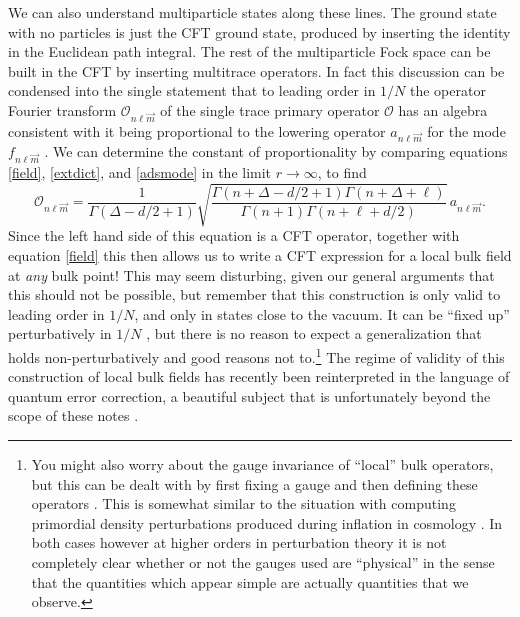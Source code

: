 \documentclass[12pt]{article}
\newcommand{\be}{\begin{equation}}
\newcommand{\ee}{\end{equation}}
\begin{document}
We can also understand multiparticle states along these lines.  The ground state with no particles is just the CFT ground state, produced by inserting the identity in the Euclidean path integral.  The rest of the multiparticle Fock space can be built in the CFT by inserting multitrace operators.  In fact this discussion can be condensed into the single statement that to leading order in $1/N$ the operator Fourier transform $\mathcal{O}_{n\ell\vec{m}}$ of the single trace primary operator $\mathcal{O}$ has an algebra consistent with it being proportional to the lowering operator $a_{n\ell\vec{m}}$ for the mode $f_{n\ell\vec{m}}$ \cite{Banks:1998dd}.  We can determine the constant of proportionality by comparing equations \eqref{field}, \eqref{extdict}, and \eqref{adsmode} in the limit $r\to \infty$, to find
\be
\mathcal{O}_{n\ell\vec{m}}=\frac{1}{\Gamma(\Delta-d/2+1)}\sqrt{\frac{\Gamma(n+\Delta-d/2+1)\Gamma(n+\Delta+\ell)}{\Gamma(n+1)\Gamma(n+\ell+d/2)}} \,a_{n\ell\vec{m}}.
\ee
Since the left hand side of this equation is a CFT operator, together with equation \eqref{field} this then allows us to write a CFT expression for a local bulk field at \textit{any} bulk point!  This may seem disturbing, given our general arguments that this should not be possible, but remember that this construction is only valid to leading order in $1/N$, and only in states close to the vacuum.  It can be ``fixed up'' perturbatively in $1/N$ \cite{Kabat:2011rz,Heemskerk:2012mn}, but there is no reason to expect a generalization that holds non-perturbatively and good reasons not to.\footnote{You  might also worry about the gauge invariance of ``local'' bulk operators, but this can be dealt with by first fixing a gauge and then defining these operators \cite{Kabat:2012av,Heemskerk:2012np}.  This is somewhat similar to the situation with computing primordial density perturbations produced during inflation in cosmology \cite{Maldacena:2002vr}.  In both cases however at higher orders in perturbation theory it is not completely clear whether or not the gauges used are ``physical'' in the sense that the quantities which appear simple are actually quantities that we observe.}  The regime of validity of this construction of local bulk fields has recently been reinterpreted in the language of quantum error correction, a beautiful subject that is unfortunately beyond the scope of these notes \cite{Almheiri:2014lwa,Pastawski:2015qua}.  
\end{document}
